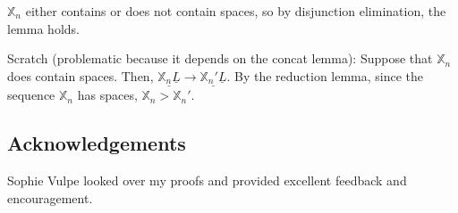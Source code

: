 \documentclass[11pt]{article}
\begin{document}
\bigskip
\(\mathbb{X}_{n}\) either contains or does not contain spaces, so by disjunction elimination, the lemma holds.

Scratch (problematic because it depends on the concat lemma):
Suppose that \(\mathbb{X}_{n}\) does contain spaces.
Then, \(\underline{\mathbb{X}_{n} \underline{L}} \to \underline{\mathbb{X}_{n}' \underline{L}}\).
By the reduction lemma, since the sequence \(\mathbb{X}_{n}\) has spaces, \(\mathbb{X}_{n} > \mathbb{X}_{n}'\).

\subsection*{Acknowledgements}
\label{sec:org4ff3a35}
Sophie Vulpe looked over my proofs and provided excellent feedback and encouragement.
\end{document}
